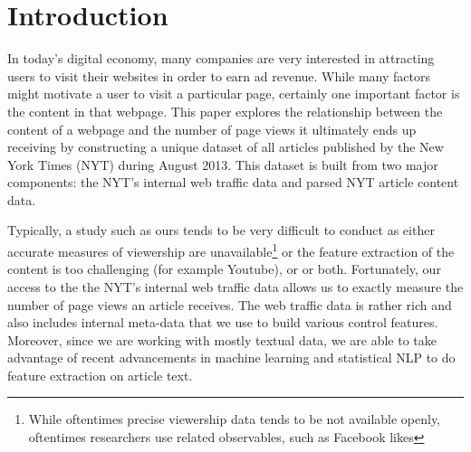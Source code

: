 \documentclass[fleqn,12pt]{SelfArx} %
\affiliation{\textsuperscript{1}\textit{dholtz@mit.edu}}
\affiliation{\textsuperscript{2}\textit{zheny@mit.edu}}
\affiliation{\textsuperscript{3}\textit{mfzhao@mit.edu}}
\begin{document}
\flushbottom %

\maketitle %

\tableofcontents %

\thispagestyle{empty} %


\section{Introduction} %

In today's digital economy, many companies are very interested in attracting users to visit their websites in order to earn ad revenue. While many factors might motivate a user to visit a particular page, certainly one important factor is the content in that webpage. This paper explores the relationship between the content of a webpage and the number of page views it ultimately ends up receiving by constructing a unique dataset of all articles published by the New York Times (NYT) during August 2013. This dataset is built from two major components: the NYT's internal web traffic data and parsed NYT article content data.

Typically, a study such as ours tends to be very difficult to conduct as either accurate measures of viewership are unavailable\footnote{While oftentimes precise viewership data tends to be not available openly, oftentimes researchers use related observables, such as Facebook likes} or the feature extraction of the content is too challenging (for example Youtube), or or both. Fortunately, our access to the the NYT's internal web traffic data allows us to exactly measure the number of page views an article receives. The web traffic data is rather rich and also includes internal meta-data that we use to build various control features. Moreover, since we are working with mostly textual data, we are able to take advantage of recent advancements in machine learning and statistical NLP to do feature extraction on article text. 
\end{document}

